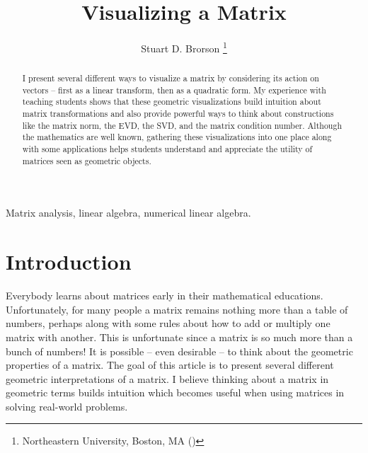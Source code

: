\documentclass[onefignum,onetabnum]{siamart190516}
\title{Visualizing a Matrix}
\author{Stuart D. Brorson \thanks{Northeastern University, Boston, MA (\email{s.brorson@northeastern.edu})}}
\begin{document}
\maketitle

\begin{abstract}
I present several different ways to visualize a matrix by considering
its action on vectors -- first as a linear transform, then as a
quadratic form.  My experience with teaching students shows that these 
geometric visualizations build intuition about matrix transformations
and also provide powerful
ways to think about constructions like the matrix norm,
the EVD, the SVD, and the matrix condition number.  Although the mathematics
are well known, gathering these visualizations into one place along with
some applications helps students understand and appreciate the utility of 
matrices seen as geometric objects.
\end{abstract}

\begin{keywords}
Matrix analysis, linear algebra, numerical linear algebra.
\end{keywords}


\tableofcontents

\section{Introduction}
Everybody learns about matrices early in their mathematical
educations.  Unfortunately, for many people a matrix remains nothing
more than a table of numbers, perhaps along with some rules about how
to add or multiply one matrix with another.  This is unfortunate since
a matrix is so much more than a bunch of numbers!  It is possible -- even
desirable -- to think about the geometric properties of a matrix.  The goal of
this article is to present several different geometric interpretations of
a matrix.  I believe thinking about a matrix in geometric terms builds
intuition which becomes useful when using matrices in solving
real-world problems.
\end{document}
